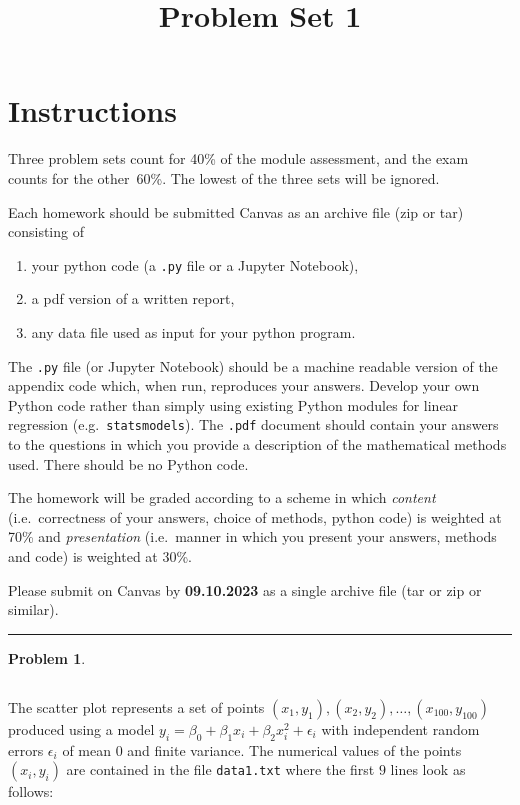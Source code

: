 \documentclass[a4paper]{amsart}
\title{Problem Set 1}
\date{}
\numberwithin{equation}{section}
\numberwithin{figure}{section}
\theoremstyle{definition}
\newtheorem{prob}{Problem}
\begin{document}
\maketitle

\section*{Instructions}

Three problem sets count for 40\% of the module assessment, and the exam counts
for the other~60\%. The lowest of the three sets will be ignored.

Each homework should be submitted Canvas as an archive file (zip or tar)
consisting of
\begin{enumerate}
  \item your python code (a \texttt{.py} file or a Jupyter Notebook),
  \item a pdf version of a written report,
  \item any data file used as input for your python program.
\end{enumerate}
The \texttt{.py} file (or Jupyter Notebook) should be a machine readable version
of the appendix code which, when run, reproduces your answers. Develop your own
Python code rather than simply using existing Python modules for linear
regression (e.g.\ \texttt{statsmodels}). The \texttt{.pdf} document should
contain your answers to the questions in which you provide a description of the
mathematical methods used. There should be no Python code. 

The homework will be graded according to a scheme in which {\em content} (i.e.\
correctness of your answers, choice of methods, python code) is weighted at 70\%
and {\em presentation} (i.e.\ manner in which you present your answers, methods
and code) is weighted at 30\%.

Please submit on Canvas by \textbf{09.10.2023} as a single archive file
(tar or zip or similar).

\vspace{1em}

\hrule

\vspace{1em}

\begin{prob}

\end{prob}


\subsection{}
The scatter plot
represents a set of points
$(x_1,y_1), (x_2,y_2), \ldots, (x_{100},y_{100})$ produced using a
model $y_i = \beta_0 +\beta_1x_i +\beta_2x_i^2 +\epsilon_i$ with
independent random errors $\epsilon_i$ of mean $0$ and finite
variance.  The numerical values of the points $(x_i,y_i)$
are contained in the file \verb!data1.txt! where the first $9$
lines look as
follows:
\end{document}
